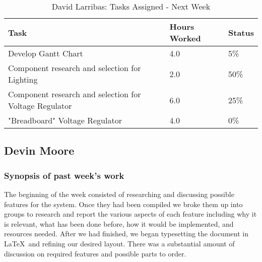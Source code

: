 \documentclass[12pt,compsoc]{IEEEtran}
\begin{document}
	\begin{table}[ht]
	\renewcommand{\arraystretch}{1.3}
		\caption{David Larribas: Tasks Assigned - Next Week}
		
		\label{Summary of David Larribas' activites: this week}
		
		\centering
		\begin{tabular}{p{5.5cm}|p{1cm}|p{1cm}}
		\hline

		\bfseries 	Task		 	                         			    & \bfseries Hours Worked	& \bfseries Status	\\
		\hline\hline
					Develop Gantt Chart										& 4.0						& 5\%				\\
                    Component research and selection for Lighting           & 2.0                       & 50\%              \\
					Component research and selection for Voltage Regulator  & 6.0						& 25\%				\\
					"Breadboard" Voltage Regulator		    				& 4.0						& 0\%				\\	
                    \hline
		\end{tabular}
	\end{table}

     
	

\subsection{Devin Moore}

	\subsubsection*{Synopsis of past week's work}

	The beginning of the week consisted of researching and discussing possible features for the system. 
	Once they had been compiled we broke them up into groups to research and report the various
	aspects of each feature including why it is relevant, what has been done before, how it would be
	implemented, and resources needed. After we had finished, we began typesetting the document in \LaTeX\
	and refining our desired layout. There was a substantial amount of discussion on required features and 
    possible parts to order.
\end{document}
